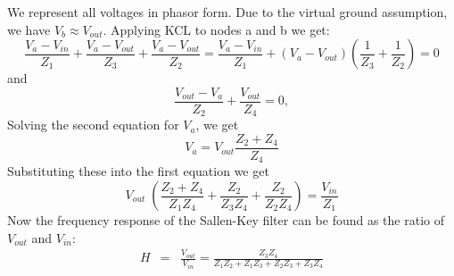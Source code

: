\documentclass{article}
\begin{document}

We represent all voltages in phasor form. Due to the virtual ground assumption, 
we have $V_b\approx V_{out}$. Applying KCL to nodes a and b we get:
\begin{equation} 
  \frac{V_a-V_{in}}{Z_1}+\frac{V_a-V_{out}}{Z_3}+\frac{V_a-V_{out}}{Z_2}
  =\frac{V_a-V_{in}}{Z_1}+(V_a-V_{out})\left(\frac{1}{Z_3}+\frac{1}{Z_2}\right)=0 
\end{equation}
and
\begin{equation}
  \frac{V_{out}-V_a}{Z_2}+\frac{V_{out}}{Z_4}=0,
\end{equation}
Solving the second equation for $V_a$, we get
\begin{equation}
  V_a=V_{out}\frac{Z_2+Z_4}{Z_4}
\end{equation}
Substituting these into the first equation we get 
\begin{equation}
  V_{out}\;\left(\frac{Z_2+Z_4}{Z_1Z_4}+\frac{Z_2}{Z_3Z_4}+\frac{Z_2}{Z_2Z_4} \right)
  =\frac{V_{in}}{Z_1}
\end{equation}
Now the frequency response of the Sallen-Key filter can be found as
the ratio of $V_{out}$ and $V_{in}$:
\begin{eqnarray}  
  H&=&\frac{V_{out}}{V_{in}}=\frac{Z_3Z_4}{Z_1Z_2+Z_1Z_3+Z_2Z_3+Z_3Z_4} 
\end{eqnarray}
\end{document}
